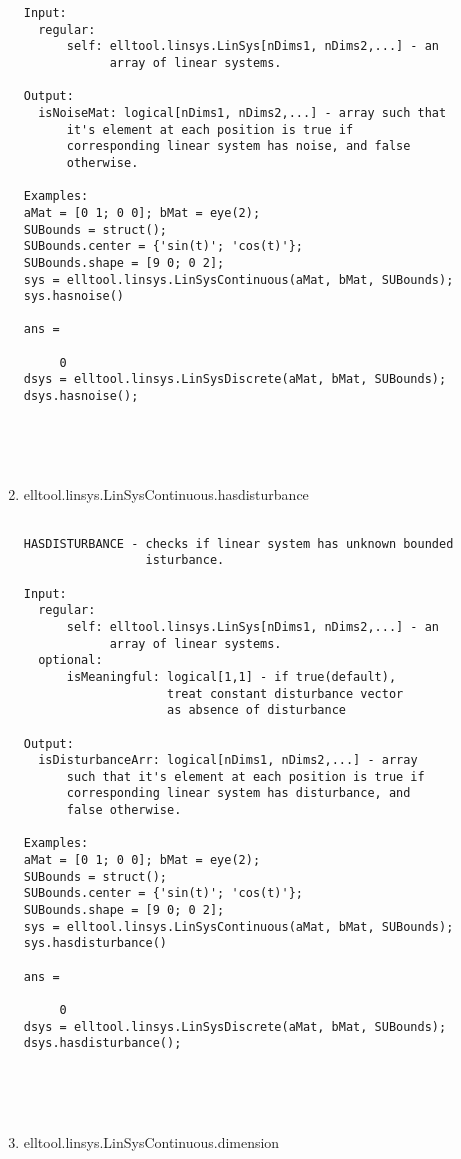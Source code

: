 \begin{enumerate}
\begin{lstlisting}
Input:
  regular:
      self: elltool.linsys.LinSys[nDims1, nDims2,...] - an
            array of linear systems.

Output:
  isNoiseMat: logical[nDims1, nDims2,...] - array such that
      it's element at each position is true if
      corresponding linear system has noise, and false
      otherwise.

Examples:
aMat = [0 1; 0 0]; bMat = eye(2);
SUBounds = struct();
SUBounds.center = {'sin(t)'; 'cos(t)'};
SUBounds.shape = [9 0; 0 2];
sys = elltool.linsys.LinSysContinuous(aMat, bMat, SUBounds);
sys.hasnoise()

ans =

     0
dsys = elltool.linsys.LinSysDiscrete(aMat, bMat, SUBounds);
dsys.hasnoise();





\end{lstlisting}
\fontfamily{\familydefault}
\selectfont
\item {elltool.linsys.LinSysContinuous.hasdisturbance}
\selectfont
\begin{lstlisting}

HASDISTURBANCE - checks if linear system has unknown bounded
                 isturbance.

Input:
  regular:
      self: elltool.linsys.LinSys[nDims1, nDims2,...] - an
            array of linear systems.
  optional:
      isMeaningful: logical[1,1] - if true(default),
                    treat constant disturbance vector
                    as absence of disturbance

Output:
  isDisturbanceArr: logical[nDims1, nDims2,...] - array
      such that it's element at each position is true if
      corresponding linear system has disturbance, and
      false otherwise.

Examples:
aMat = [0 1; 0 0]; bMat = eye(2);
SUBounds = struct();
SUBounds.center = {'sin(t)'; 'cos(t)'};
SUBounds.shape = [9 0; 0 2];
sys = elltool.linsys.LinSysContinuous(aMat, bMat, SUBounds);
sys.hasdisturbance()

ans =

     0
dsys = elltool.linsys.LinSysDiscrete(aMat, bMat, SUBounds);
dsys.hasdisturbance();





\end{lstlisting}
\fontfamily{\familydefault}
\selectfont
\item {elltool.linsys.LinSysContinuous.dimension}
\selectfont
\begin{lstlisting}


\end{lstlisting}
\end{enumerate}

